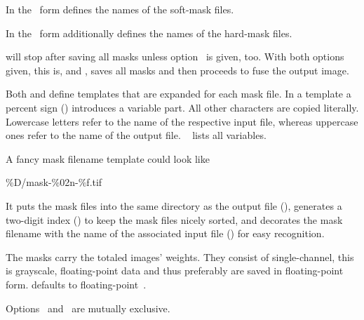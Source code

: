 \begin{codelist}
\begin{sloppypar}
      In the \oldstylesecond~form  defines the names of
      the soft-mask files.

      In the \oldstylethird~form  additionally defines the
      names of the hard-mask files.
    \end{sloppypar}

    \App{} will stop after saving all masks unless
    option~ is given, too.  With both options given,
    this is,  and , \App{} saves all masks and then
    proceeds to fuse the output image.

    Both  and 
    define templates that are expanded for each mask file.  In a template a percent sign
    (\sample{\%}) introduces a variable part.  All other characters are copied literally.
    Lowercase letters refer to the name of the respective input file, whereas uppercase ones
    refer to the name of the output file.  \tableName~
    lists all variables.

    A fancy mask filename template could look like
    \begin{literal}
      \%D/mask-\%02n-\%f.tif
    \end{literal}
    It puts the mask files into the same directory as the output file (), generates
    a two-digit index () to keep the mask files nicely sorted, and decorates the
    mask filename with the name of the associated input file () for easy
    recognition.

    The masks carry the totaled images' weights.  They consist of single-channel, this is
    grayscale, floating-point data and thus preferably are saved in floating-point form.  \App{}
    defaults to floating-point~.

    Options~ and~ are mutually exclusive.
\fi
\end{codelist}


\ifenfuse
  
\fi



